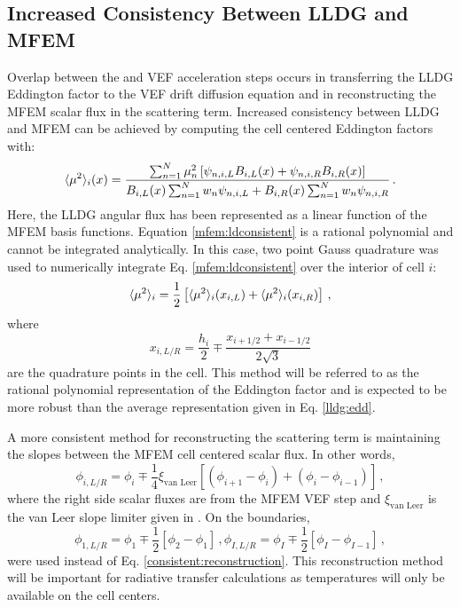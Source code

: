 \subsection{Increased Consistency Between LLDG and MFEM}
Overlap between the \SN and VEF acceleration steps occurs in transferring the LLDG Eddington factor to the VEF drift diffusion equation and in reconstructing the MFEM scalar flux in the \SN scattering term. Increased consistency between LLDG and MFEM can be achieved by computing the cell centered Eddington factors with: 
	\begin{equation} \label{mfem:ldconsistent}
		\langle \mu^2 \rangle_i(x) = \frac{
			\sum_{n=1}^N \mu_n^2 \left[\psi_{n,i,L}B_{i,L}(x) + \psi_{n,i,R} B_{i,R}(x)\right]
		}
		{
			B_{i,L}(x) \sum_{n=1}^N w_n \psi_{n,i,L} + B_{i,R}(x) \sum_{n=1}^N w_n \psi_{n,i,R} 
		} \,. 
	\end{equation}
Here, the LLDG angular flux has been represented as a linear function of the MFEM basis functions. Equation \ref{mfem:ldconsistent} is a rational polynomial and cannot be integrated analytically. In this case, two point Gauss quadrature was used to numerically integrate Eq. \ref{mfem:ldconsistent} over the interior of cell $i$: 
	\begin{equation} 
		\langle \mu^2 \rangle_i = \frac{1}{2} \left[\langle \mu^2 \rangle_i(x_{i,L}) + \langle \mu^2 \rangle_i(x_{i,R})\right] \,, 
	\end{equation}
where 
	\begin{equation} 
		x_{i,L/R} = \frac{h_i}{2} \mp \frac{x_{i+1/2} + x_{i-1/2}}{2\sqrt{3}}
	\end{equation}
are the quadrature points in the cell. This method will be referred to as the rational polynomial representation of the Eddington factor and is expected to be more robust than the average representation given in Eq. \ref{lldg:edd}. 

A more consistent method for reconstructing the \SN scattering term is maintaining the slopes between the MFEM cell centered scalar flux. In other words, 
	\begin{equation} \label{consistent:reconstruction}
		\phi_{i,L/R} = \phi_i \mp \frac{1}{4} \xi_\text{van Leer} \left[\left(\phi_{i+1} - \phi_i\right) + \left(\phi_i - \phi_{i-1}\right) \right] \,,
	\end{equation}
where the right side scalar fluxes are from the MFEM VEF step and $\xi_\text{van Leer}$ is the van Leer slope limiter given in \cite{vanLeer}. On the boundaries, 
	\begin{subequations}
		\begin{equation}
			\phi_{1,L/R} = \phi_1 \mp \frac{1}{2} \left[\phi_2 - \phi_1\right] \,,
		\end{equation}
		\begin{equation}
			\phi_{I,L/R} = \phi_I \mp \frac{1}{2} \left[\phi_I - \phi_{I-1}\right] \,,
		\end{equation}
	\end{subequations}
were used instead of Eq. \ref{consistent:reconstruction}. This reconstruction method will be important for radiative transfer calculations as temperatures will only be available on the cell centers. 